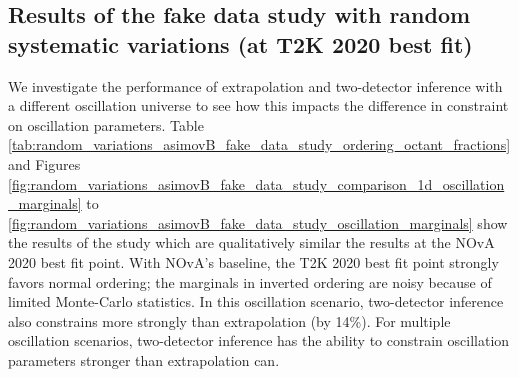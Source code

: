 \documentclass{article}
\begin{document}
\subsection{Results of the fake data study with random systematic variations (at T2K 2020 best fit)}
We investigate the performance of extrapolation and two-detector inference with a different oscillation universe to see how this impacts the difference in constraint on oscillation parameters. Table \ref{tab:random_variations_asimovB_fake_data_study_ordering_octant_fractions} and Figures \ref{fig:random_variations_asimovB_fake_data_study_comparison_1d_oscillation_marginals} to \ref{fig:random_variations_asimovB_fake_data_study_oscillation_marginals} show the results of the study which are qualitatively similar the results at the NOvA 2020 best fit point. With NOvA's baseline, the T2K 2020 best fit point strongly favors normal ordering; the marginals in inverted ordering are noisy because of limited Monte-Carlo statistics. In this oscillation scenario, two-detector inference also constrains  more strongly than extrapolation (by 14\%). For multiple oscillation scenarios, two-detector inference has the ability to constrain oscillation parameters stronger than extrapolation can.
\end{document}
